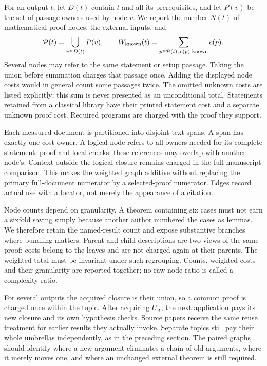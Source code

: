 \documentclass[11pt,a4paper]{article}
\begin{document}
For an output $t$, let $D(t)$ contain $t$ and all its prerequisites, and
let $P(v)$ be the set of passage owners used by node $v$. We report the
number $N(t)$ of mathematical proof nodes, the external inputs, and
\[
 \mathcal P(t)=\bigcup_{v\in D(t)}P(v),\qquad
 W_{\rm known}(t)=\sum_{p\in\mathcal P(t),\,c(p)\text{ known}}c(p).
\]
Several nodes may refer to the same statement or setup passage. Taking
the union before summation charges that passage once. Adding the displayed
node costs would in general count some passages twice.
The omitted unknown costs are listed explicitly; this sum is never
presented as an unconditional total. Statements retained from a classical
library have their printed statement cost and a separate unknown proof
cost. Required programs are charged with the proof they support.

Each measured document is partitioned into disjoint text spans. A span
has exactly one cost owner. A logical node refers to all owners needed
for its complete statement, proof and local checks; these references may
overlap with another node's. Context outside the logical closure remains
charged in the full-manuscript comparison. This makes the weighted graph
additive without replacing the primary full-document numerator by a
selected-proof numerator. Edges record actual use with a locator, not
merely the appearance of a citation.

Node counts depend on granularity. A theorem containing six cases must
not earn a sixfold saving simply because another author numbered the
cases as lemmas. We therefore retain the named-result count and expose
substantive branches where bundling matters. Parent and child descriptions
are two views of the same proof: costs belong to the leaves and are not
charged again at their parents. The weighted total must be invariant
under such regrouping. Counts, weighted costs and their granularity are
reported together; no raw node ratio is called a complexity ratio.

For several outputs the acquired closure is their union, so a common
proof is charged once within the topic. After acquiring $U_A$, the next
application pays its new closure and its own hypothesis checks. Source
papers receive the same reuse treatment for earlier results they actually
invoke. Separate topics still pay their whole umbrellas independently,
as in the preceding section. The paired graphs should identify where a
new argument eliminates a chain of old arguments, where it merely moves
one, and where an unchanged external theorem is still required.
\end{document}
